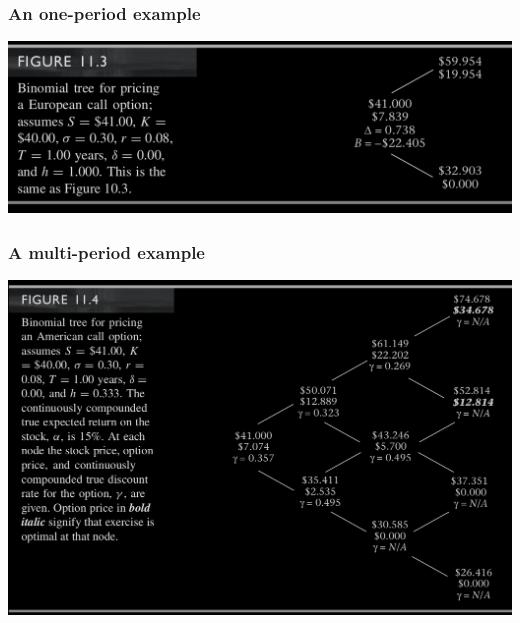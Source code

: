 \begin{frame}[fragile,t]
	\frametitle{An one-period example}
	\begin{center}
		\includegraphics[scale=0.25]{figs/Figure-11-3.png}
	\end{center}
\end{frame}
\begin{frame}[fragile,t]
	\frametitle{A multi-period example}
	\begin{center}
		\includegraphics[scale=0.25]{figs/Figure-11-4.png}
	\end{center}
\end{frame}
